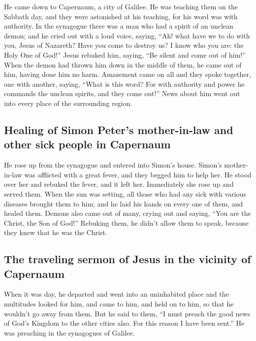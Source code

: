  He came down to Capernaum, a city of Galilee. He was
teaching them on the Sabbath day,  and they were
astonished at his teaching, for his word was with authority.
 In the synagogue there was a man who had a spirit of an
unclean demon; and he cried out with a loud voice, 
saying, ``Ah! what have we to do with you, Jesus of Nazareth? Have you
come to destroy us? I know who you are: the Holy One of God!''
 Jesus rebuked him, saying, ``Be silent and come out of
him!'' When the demon had thrown him down in the middle of them, he came
out of him, having done him no harm.  Amazement came on
all and they spoke together, one with another, saying, ``What is this
word? For with authority and power he commands the unclean spirits, and
they come out!''  News about him went out into every
place of the surrounding region.

\hypertarget{healing-of-simon-peters-mother-in-law-and-other-sick-people-in-capernaum}{%
\subsection{Healing of Simon Peter's mother-in-law and other sick people
in
Capernaum}\label{healing-of-simon-peters-mother-in-law-and-other-sick-people-in-capernaum}}

 He rose up from the synagogue and entered into Simon's
house. Simon's mother-in-law was afflicted with a great fever, and they
begged him to help her.  He stood over her and rebuked
the fever, and it left her. Immediately she rose up and served them.
 When the sun was setting, all those who had any sick
with various diseases brought them to him; and he laid his hands on
every one of them, and healed them.  Demons also came out
of many, crying out and saying, ``You are the Christ, the Son of God!''
Rebuking them, he didn't allow them to speak, because they knew that he
was the Christ.

\hypertarget{the-traveling-sermon-of-jesus-in-the-vicinity-of-capernaum}{%
\subsection{The traveling sermon of Jesus in the vicinity of
Capernaum}\label{the-traveling-sermon-of-jesus-in-the-vicinity-of-capernaum}}

 When it was day, he departed and went into an
uninhabited place and the multitudes looked for him, and came to him,
and held on to him, so that he wouldn't go away from them.
 But he said to them, ``I must preach the good news of
God's Kingdom to the other cities also. For this reason I have been
sent.''  He was preaching in the synagogues of Galilee.


